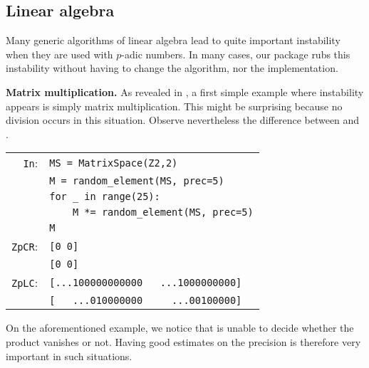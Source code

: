 \documentclass[sigconf]{acmart}
\newcommand{\ZpCR}{\text{\color{output} \rm \tt ZpCR}\xspace}
\newcommand{\ZpL}{\text{\color{output} \rm \tt ZpL}\xspace}
\newcommand{\ZpLC}{\text{\color{output} \rm \tt ZpLC}\xspace}
\newcommand{\cIn}{{\color{input} \tt \phantom{Zp}In}:}
\newcommand{\cZpCR}{{\color{output} \tt ZpCR}:}
\newcommand{\cZpLC}{{\color{output} \tt ZpLC}:}
\theoremstyle{definition}
\begin{document}
\subsection{Linear algebra}
\label{ssec:linalg}

Many generic algorithms of linear algebra lead to quite important 
instability when they are used with $p$-adic numbers. In many cases, 
our package \ZpL rubs this instability without having to change the 
algorithm, nor the implementation.

\medskip

\noindent \textbf{Matrix multiplication.}
%
As revealed in \cite{caruso-roe-vaccon:15}, a first simple example where 
instability appears is simply matrix multiplication.
This might be surprising because no division occurs in this situation.
Observe nevertheless the difference between \ZpCR and \ZpLC.

\smallskip

{\noindent \small
\begin{tabular}{rl}
\cIn
 & \verb?MS = ?{\color{constructor}\verb?MatrixSpace?}\verb?(?{\color{ring}\verb?Z2?}\verb?,2)? \\
 & \verb?M = ?{\color{function}\verb?random_element?}\verb?(MS, prec=5)? \\
 & \verb?for _ in range(25):? \\
 & \verb?    M *= ?{\color{function}\verb?random_element?}\verb?(MS, prec=5)? \\
 & \verb?M? \\
\cZpCR
 & \verb?[0 0]? \\
 & \verb?[0 0]? \\
\cZpLC
 & \verb?[...100000000000   ...1000000000]? \\
 & \verb?[   ...010000000     ...00100000]? \\
\end{tabular}}


\smallskip

\noindent
On the aforementioned example, we notice that \ZpCR is unable to decide 
whether the product vanishes or not. Having good estimates on the 
precision is therefore very important in such situations.
\end{document}
